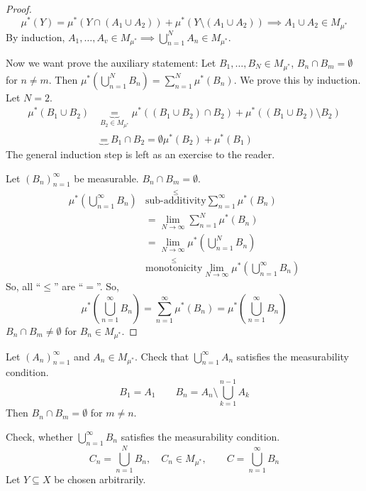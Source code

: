 \documentclass{article}
\begin{document}
\begin{proof}
  \[ \mu^*(Y) = \mu^*(Y \cap (A_1 \cup A_2)) + \mu^*(Y \setminus (A_1 \cup A_2)) \implies A_1 \cup A_2 \in M_{\mu^*} \]
  By induction, $A_1, \ldots, A_v \in M_{\mu^*} \implies \bigcup_{n=1}^N A_n \in M_{\mu^*}$.

  Now we want prove the auxiliary statement:
  Let $B_1, \ldots, B_N \in M_{\mu^*}$, $B_n \cap B_m = \emptyset$ for $n\neq m$.
  Then $\mu^*\left(\bigcup_{n=1}^N B_n\right) = \sum_{n=1}^N \mu^*(B_n)$.
  We prove this by induction.
  Let $N=2$.
  \begin{align*}
    \mu^*(B_1 \cup B_2) &\underbrace{=}_{B_2 \in M_{\mu^*}} \mu^*((B_1 \cup B_2) \cap B_2) + \mu^*((B_1 \cup B_2) \setminus B_2) \\
        &\underbrace{=}{B_1 \cap B_2 = \emptyset} \mu^*(B_2) + \mu^*(B_1)
  \end{align*}
  The general induction step is left as an exercise to the reader.

  Let $(B_n)_{n=1}^\infty$ be measurable. $B_n \cap B_m = \emptyset$.
  \begin{align*}
    \mu^*(\bigcup_{n=1}^\infty B_n) 
      &\stackrel{\leq}{\text{sub-additivity}} \sum_{n=1}^\infty \mu^*(B_n) \\
      &= \lim_{N\to\infty} \sum_{n=1}^N \mu^*(B_n) \\
      &= \lim_{N\to\infty} \mu^*(\bigcup_{n=1}^N B_n) \\
      &\stackrel{\leq}{\text{monotonicity}} \lim_{N\to\infty} \mu^*(\bigcup_{n=1}^\infty B_n)
  \end{align*}
  So, all \enquote{$\leq$} are \enquote{$=$}. So,
  \[ \mu^*(\bigcup_{n=1}^\infty B_n) = \sum_{n=1}^\infty \mu^*(B_n) = \mu^*(\bigcup_{n=1}^\infty B_n) \]
  $B_n \cap B_m \neq \emptyset$ for $B_n \in M_{\mu^*}$.
\end{proof}

Let $(A_n)_{n=1}^\infty$ and $A_n \in M_{\mu^*}$.
Check that $\bigcup_{n=1}^\infty A_n$ satisfies the measurability condition.
\[ B_1 = A_1 \qquad B_n = A_n \setminus \bigcup_{k=1}^{n-1} A_k \]
Then $B_n \cap B_m = \emptyset$ for $m \neq n$.

Check, whether $\bigcup_{n=1}^\infty B_n$ satisfies the measurability condition.
\[ C_n = \bigcup_{n=1}^N B_n, \quad C_n \in M_{\mu^*}, \quad \quad C = \bigcup_{n=1}^\infty B_n \]
Let $Y \subseteq X$ be chosen arbitrarily.
\end{document}
